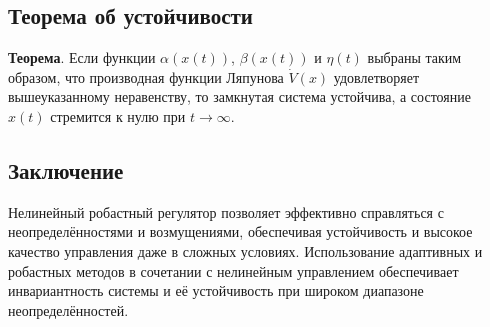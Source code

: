 \documentclass[a4paper,14pt]{extarticle} %
\begin{document}
\subsection*{Теорема об устойчивости}

\textbf{Теорема}. Если функции \( \alpha(x(t)) \), \( \beta(x(t)) \) и \( \eta(t) \) выбраны таким образом, что производная функции Ляпунова \( \dot{V}(x) \) удовлетворяет вышеуказанному неравенству, то замкнутая система устойчива, а состояние \( x(t) \) стремится к нулю при \( t \to \infty \).

\subsection*{Заключение}

Нелинейный робастный регулятор позволяет эффективно справляться с неопределённостями и возмущениями, обеспечивая устойчивость и высокое качество управления даже в сложных условиях. Использование адаптивных и робастных методов в сочетании с нелинейным управлением обеспечивает инвариантность системы и её устойчивость при широком диапазоне неопределённостей.
\end{document}
